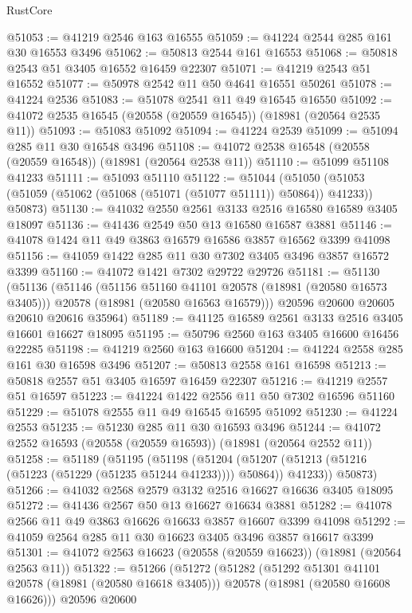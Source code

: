 \begin{lexlean}{RustCore}
\begin{coremodule}
@51053 := @41219 @2546 @163 @16555
@51059 := @41224 @2544 @285 @161 @30 @16553 @3496
@51062 := @50813 @2544 @161 @16553
@51068 := @50818 @2543 @51 @3405 @16552 @16459 @22307
@51071 := @41219 @2543 @51 @16552
@51077 := @50978 @2542 @11 @50 @4641 @16551 @50261
@51078 := @41224 @2536
@51083 := @51078 @2541 @11 @49 @16545 @16550
@51092 := @41072 @2535 @16545 (@20558 (@20559 @16545)) (@18981 (@20564 @2535 @11))
@51093 := @51083 @51092
@51094 := @41224 @2539
@51099 := @51094 @285 @11 @30 @16548 @3496
@51108 := @41072 @2538 @16548 (@20558 (@20559 @16548)) (@18981 (@20564 @2538 @11))
@51110 := @51099 @51108 @41233
@51111 := @51093 @51110
@51122 := @51044
    (@51050 (@51053 (@51059 (@51062 (@51068 (@51071 (@51077 @51111)) @50864)) @41233)) @50873)
@51130 := @41032 @2550 @2561 @3133 @2516 @16580 @16589 @3405 @18097
@51136 := @41436 @2549 @50 @13 @16580 @16587 @3881
@51146 := @41078 @1424 @11 @49 @3863 @16579 @16586 @3857 @16562 @3399 @41098
@51156 := @41059 @1422 @285 @11 @30 @7302 @3405 @3496 @3857 @16572 @3399
@51160 := @41072 @1421 @7302 @29722 @29726
@51181 := @51130
    (@51136
      (@51146
        (@51156 @51160 @41101 @20578 (@18981 (@20580 @16573 @3405)))
        @20578
        (@18981 (@20580 @16563 @16579)))
      @20596
      @20600
      @20605
      @20610
      @20616
      @35964)
@51189 := @41125 @16589 @2561 @3133 @2516 @3405 @16601 @16627 @18095
@51195 := @50796 @2560 @163 @3405 @16600 @16456 @22285
@51198 := @41219 @2560 @163 @16600
@51204 := @41224 @2558 @285 @161 @30 @16598 @3496
@51207 := @50813 @2558 @161 @16598
@51213 := @50818 @2557 @51 @3405 @16597 @16459 @22307
@51216 := @41219 @2557 @51 @16597
@51223 := @41224 @1422 @2556 @11 @50 @7302 @16596 @51160
@51229 := @51078 @2555 @11 @49 @16545 @16595 @51092
@51230 := @41224 @2553
@51235 := @51230 @285 @11 @30 @16593 @3496
@51244 := @41072 @2552 @16593 (@20558 (@20559 @16593)) (@18981 (@20564 @2552 @11))
@51258 := @51189
    (@51195
      (@51198
        (@51204 (@51207 (@51213 (@51216 (@51223 (@51229 (@51235 @51244 @41233)))) @50864)) @41233))
      @50873)
@51266 := @41032 @2568 @2579 @3132 @2516 @16627 @16636 @3405 @18095
@51272 := @41436 @2567 @50 @13 @16627 @16634 @3881
@51282 := @41078 @2566 @11 @49 @3863 @16626 @16633 @3857 @16607 @3399 @41098
@51292 := @41059 @2564 @285 @11 @30 @16623 @3405 @3496 @3857 @16617 @3399
@51301 := @41072 @2563 @16623 (@20558 (@20559 @16623)) (@18981 (@20564 @2563 @11))
@51322 := @51266
    (@51272
      (@51282
        (@51292 @51301 @41101 @20578 (@18981 (@20580 @16618 @3405)))
        @20578
        (@18981 (@20580 @16608 @16626)))
      @20596
      @20600

\end{coremodule}
\end{lexlean}
